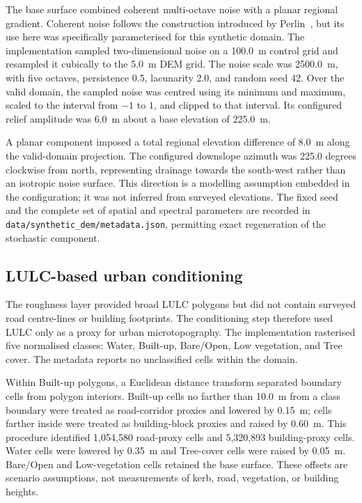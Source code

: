 The base surface combined coherent multi-octave noise with a planar regional
gradient.  Coherent noise follows the construction introduced by
Perlin~\cite{Perlin1985}, but its use here was specifically parameterised for
this synthetic domain.  The implementation sampled two-dimensional noise on a
100.0~m control grid and resampled it cubically to the 5.0~m DEM grid.  The
noise scale was 2500.0~m, with five octaves, persistence 0.5, lacunarity 2.0,
and random seed 42.  Over the valid domain, the sampled noise was centred using
its minimum and maximum, scaled to the interval from \(-1\) to \(1\), and
clipped to that interval.  Its configured relief amplitude was 6.0~m about a
base elevation of 225.0~m.

A planar component imposed a total regional elevation difference of 8.0~m
along the valid-domain projection.  The configured downslope azimuth was
225.0 degrees clockwise from north, representing drainage towards the
south-west rather than an isotropic noise surface.  This direction is a
modelling assumption embedded in the configuration; it was not inferred from
surveyed elevations.  The fixed seed and the complete set of spatial and
spectral parameters are recorded in
\texttt{data/synthetic\_dem/metadata.json}, permitting exact regeneration of
the stochastic component.

\subsection{LULC-based urban conditioning}

The roughness layer provided broad LULC polygons but did not contain surveyed
road centre-lines or building footprints.  The conditioning step therefore
used LULC only as a proxy for urban microtopography.  The implementation
rasterised five normalised classes: Water, Built-up, Bare/Open, Low vegetation,
and Tree cover.  The metadata reports no unclassified cells within the domain.

Within Built-up polygons, a Euclidean distance transform separated boundary
cells from polygon interiors.  Built-up cells no farther than 10.0~m from a
class boundary were treated as road-corridor proxies and lowered by 0.15~m;
cells farther inside were treated as building-block proxies and raised by
0.60~m.  This procedure identified 1,054,580 road-proxy cells and 5,320,893
building-proxy cells.  Water cells were lowered by 0.35~m and Tree-cover cells
were raised by 0.05~m.  Bare/Open and Low-vegetation cells retained the base
surface.  These offsets are scenario assumptions, not measurements of kerb,
road, vegetation, or building heights.

